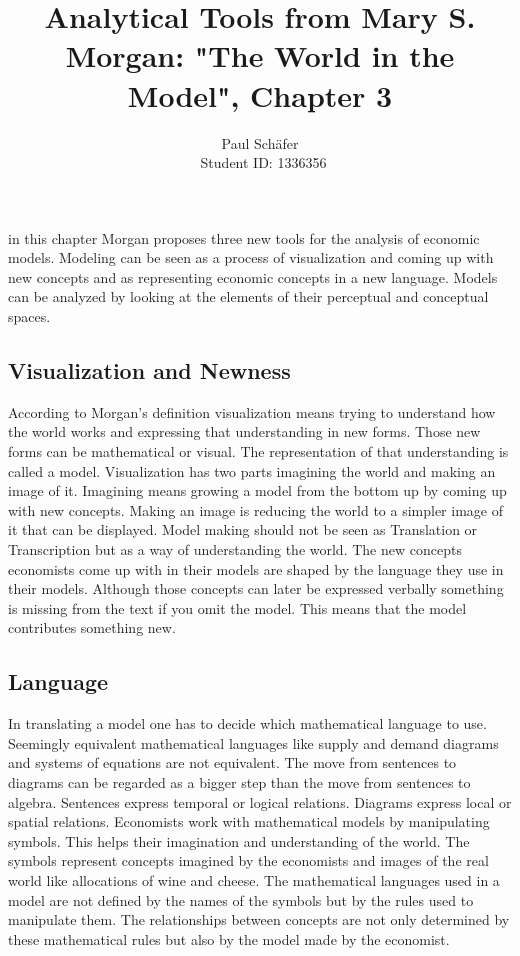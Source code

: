 \documentclass[a4paper, 12pt]{article}
\author{Paul Sch\"afer \\\ Student ID: 1336356}
\begin{document}
\title{Analytical Tools from Mary S. Morgan: "The World in the Model", Chapter 3}
\maketitle
in this chapter Morgan proposes three new tools for the analysis of economic models. Modeling can be seen as a process of visualization and coming up with new concepts and as representing economic concepts in a new language. Models can be analyzed by looking at the elements of their perceptual and conceptual spaces.

\subsection*{Visualization and Newness}
According to Morgan's definition visualization means trying to understand how the world works and expressing that understanding in new forms. Those new forms can be mathematical or visual. The representation of that understanding is called a model. Visualization has two parts imagining the world and making an image of it. Imagining means growing a model from the bottom up by coming up with new concepts. Making an image is reducing the world to a simpler image of it that can be displayed. Model making should not be seen as Translation or Transcription but as a way of understanding the world. The new concepts economists come up with in their models are shaped by the language they use in their models. Although those concepts can later be expressed verbally something is missing from the text if you omit the model. This means that the model contributes something new.

\subsection*{Language}
In translating a model one has to decide which mathematical language to use. Seemingly equivalent mathematical languages like supply and demand diagrams and systems of equations are not equivalent. The move from sentences to diagrams can be regarded as a bigger step than the move from sentences to algebra. Sentences express temporal or logical relations. Diagrams express local or spatial relations. 
Economists work with mathematical models by manipulating symbols. This helps their imagination and understanding of the world. The symbols represent concepts imagined by the economists and images of the real world like allocations of wine and cheese. The mathematical languages used in a model are not defined by the names of the symbols but by the rules used to manipulate them.
The relationships between concepts are not only determined by these mathematical rules but also by the model made by the economist. 
\end{document}
